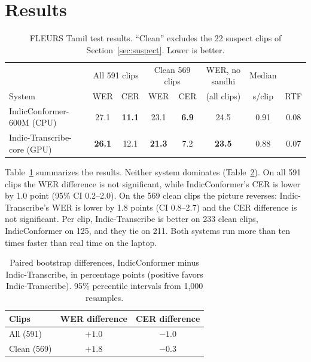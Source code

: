 \documentclass[11pt]{article}
\begin{document}
\section{Results}
\label{sec:results}

\begin{table}[t]
\centering\small
\caption{FLEURS Tamil test results. ``Clean'' excludes the 22 suspect clips of
Section~\ref{sec:suspect}. Lower is better.}
\label{tab:asr}
\begin{tabular}{lccccccc}
\toprule
& \multicolumn{2}{c}{All 591 clips} & \multicolumn{2}{c}{Clean 569 clips} & WER, no sandhi & Median & \\
System & WER & CER & WER & CER & (all clips) & s/clip & RTF \\
\midrule
IndicConformer-600M (CPU) & 27.1 & \textbf{11.1} & 23.1 & \textbf{6.9} & 24.5 & 0.91 & 0.08 \\
Indic-Transcribe-core (GPU) & \textbf{26.1} & 12.1 & \textbf{21.3} & 7.2 & \textbf{23.5} & 0.88 & 0.07 \\
\bottomrule
\end{tabular}
\end{table}

Table~\ref{tab:asr} summarizes the results. Neither system dominates (Table~\ref{tab:boot}). On all
591 clips the WER difference is not significant, while IndicConformer's CER is lower by 1.0 point
(95\% CI 0.2--2.0). On the 569 clean clips the picture reverses: Indic-Transcribe's WER is lower by
1.8 points (CI 0.8--2.7) and the CER difference is not significant. Per clip, Indic-Transcribe is
better on 233 clean clips, IndicConformer on 125, and they tie on 211. Both systems run more than
ten times faster than real time on the laptop.

\begin{table}[t]
\centering\small
\caption{Paired bootstrap differences, IndicConformer minus Indic-Transcribe, in percentage points
(positive favors Indic-Transcribe). 95\% percentile intervals from 1,000 resamples.}
\label{tab:boot}
\begin{tabular}{lcc}
\toprule
Clips & WER difference & CER difference \\
\midrule
All (591) & $+1.0$ \;[$-0.2$, $+2.1$] & $-1.0$ \;[$-2.0$, $-0.2$] \\
Clean (569) & $+1.8$ \;[$+0.8$, $+2.7$] & $-0.3$ \;[$-1.1$, $+0.3$] \\
\bottomrule
\end{tabular}
\end{table}
\end{document}
